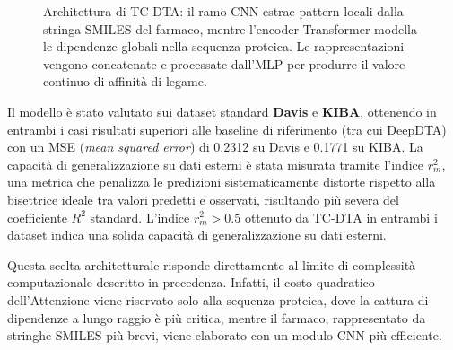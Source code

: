 \begin{figure}[ht]
{
}
\caption{Architettura di TC-DTA: il ramo CNN estrae pattern
locali dalla stringa SMILES del farmaco, mentre l'encoder Transformer modella le dipendenze globali nella sequenza proteica. Le
rappresentazioni vengono concatenate e processate dall'MLP per
produrre il valore continuo di affinità di legame.}
\label{fig:tcdta}
\end{figure}
Il modello è stato valutato sui dataset standard \textbf{Davis} e \textbf{KIBA}, ottenendo in entrambi i casi risultati superiori alle baseline di riferimento (tra cui DeepDTA) con un MSE (\textit{mean squared error}) di 0.2312 su Davis e 0.1771 su KIBA.
La capacità di generalizzazione su dati esterni è stata misurata tramite
l'indice $r^2_m$, una metrica che penalizza le predizioni sistematicamente
distorte rispetto alla bisettrice ideale tra valori predetti e osservati,
risultando più severa del coefficiente $R^2$ standard.
L'indice $r^2_m > 0.5$ ottenuto da TC-DTA in entrambi i dataset indica una solida capacità di generalizzazione su dati esterni.

Questa scelta architetturale risponde direttamente al limite di complessità computazionale descritto in precedenza. Infatti, il costo quadratico dell'Attenzione viene riservato solo alla sequenza proteica, dove la cattura di dipendenze a lungo raggio è più critica, mentre il farmaco, rappresentato da stringhe SMILES più brevi, viene elaborato con un modulo CNN più efficiente.

